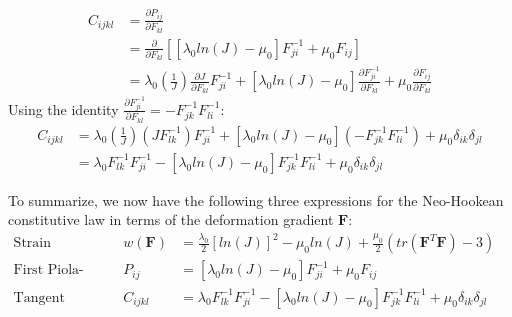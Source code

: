 \documentclass[]{spie}  %
\begin{document}
\begin{align}
C_{ijkl} 	&= \frac{\partial P_{ij}}{\partial F_{kl}} \\
			&= \frac{\partial}{\partial F_{kl}} \left[\left[\lambda_0 ln(J) - \mu_0 \right]F^{-1}_{ji} + \mu_0 F_{ij}\right] \\
			&= \lambda_0 \left(\frac{1}{J}\right) \frac{\partial J}{\partial F_{kl}} F^{-1}_{ji} + \left[\lambda_0 ln(J) - \mu_0 \right] \frac{\partial F^{-1}_{ji}}{\partial F_{kl}} + \mu_0 \frac{\partial F_{ij}}{\partial F_{kl}}
\end{align}
Using the identity $\frac{\partial F^{-1}_{ji}}{\partial F_{kl}} = -F^{-1}_{jk} F^{-1}_{li}$:
\begin{align}
C_{ijkl}	&= \lambda_0 \left(\frac{1}{J}\right) (J F^{-1}_{lk}) F^{-1}_{ji} + \left[\lambda_0 ln(J) - \mu_0 \right]\left(-F^{-1}_{jk} F^{-1}_{li}\right) + \mu_0 \delta_{ik}\delta_{jl} \\
			&= \lambda_0  F^{-1}_{lk} F^{-1}_{ji} - \left[\lambda_0 ln(J) - \mu_0 \right] F^{-1}_{jk} F^{-1}_{li} + \mu_0 \delta_{ik}\delta_{jl}
\end{align}

To summarize, we now have the following three expressions for the Neo-Hookean constitutive law in terms of the deformation gradient $\bm{F}$:
\begin{align}
\textrm{Strain Energy Density:}			& \ & w(\bm{F}) &= \frac{\lambda_0}{2}[ln(J)]^2 - \mu_0 ln(J) +
															\frac{\mu_0}{2}(tr(\bm{F}^T\bm{F}) - 3) & \\
\textrm{First Piola-Kirchhoff Stress:} 	& \ & P_{ij} 	&= \left[\lambda_0 ln(J) - \mu_0 \right]F^{-1}_{ji} + \mu_0 F_{ij}
															& \\
\textrm{Tangent Moduli:}				& \ & C_{ijkl}	&= \lambda_0  F^{-1}_{lk} F^{-1}_{ji} - \left[\lambda_0 ln(J) -
															\mu_0 \right] F^{-1}_{jk} F^{-1}_{li} + \mu_0 \delta_{ik}\delta_{jl} &
\end{align}
\end{document}
